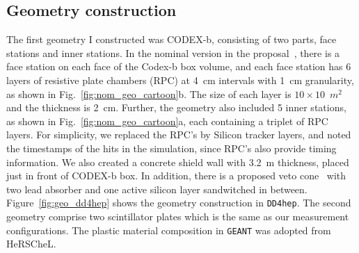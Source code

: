 





\subsection{Geometry construction}
The first geometry I constructed was CODEX-b, consisting of two parts, face stations and inner stations. In the nominal version in the proposal~\cite{Gligorov:2017nwh}, there is a face station on each face of the Codex-b box volume, and each face station has 6 layers of resistive plate chambers (RPC) at 4~cm intervals with 1~cm granularity, as shown in Fig.~\ref{fig:nom_geo_cartoon}b. The size of each layer is $10 \times 10$~$m^{2}$ and the thickness is 2~cm. Further, the geometry also included 5 inner stations, as shown in Fig.~\ref{fig:nom_geo_cartoon}a, each containing a triplet of RPC layers. For simplicity, we replaced the RPC's by Silicon tracker layers, and noted the timestamps of the hits in the simulation, since RPC's also provide timing information. We also created a concrete shield wall with 3.2~m thickness, placed just in front of CODEX-b box. In addition, there is a proposed veto cone~\cite{Gligorov:2017nwh} with two lead absorber and one active silicon layer sandwitched in between. Figure~\ref{fig:geo_dd4hep} shows the geometry construction in {\tt DD4hep}. The second geometry comprise two scintillator plates which is the same as our measurement configurations. The plastic material composition in {\tt GEANT} was adopted from HeRSCheL.


